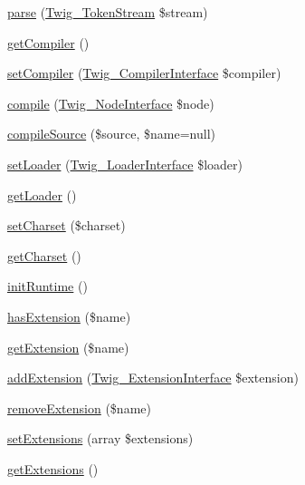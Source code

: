 \begin{DoxyCompactItemize}
\item 
\hyperlink{class_twig___environment_a1de4218ce9c025eaa18ce55616c98fe7}{parse} (\hyperlink{class_twig___token_stream}{Twig\+\_\+\+Token\+Stream} \$stream)
\item 
\hyperlink{class_twig___environment_ac37cd6bf8b37e0cde150727f16a535f8}{get\+Compiler} ()
\item 
\hyperlink{class_twig___environment_a1dcd474337e99babac147ee2384353de}{set\+Compiler} (\hyperlink{interface_twig___compiler_interface}{Twig\+\_\+\+Compiler\+Interface} \$compiler)
\item 
\hyperlink{class_twig___environment_a3f2ebfe4306bcd152c544085112319b5}{compile} (\hyperlink{interface_twig___node_interface}{Twig\+\_\+\+Node\+Interface} \$node)
\item 
\hyperlink{class_twig___environment_a71d4b339e442b2024b9849b9bc802b7a}{compile\+Source} (\$source, \$name=null)
\item 
\hyperlink{class_twig___environment_a7b2e6b9f72715d88eebb3ee0816057b4}{set\+Loader} (\hyperlink{interface_twig___loader_interface}{Twig\+\_\+\+Loader\+Interface} \$loader)
\item 
\hyperlink{class_twig___environment_a461527c1de39a5520c52951b8f03d99f}{get\+Loader} ()
\item 
\hyperlink{class_twig___environment_a81ee11b0f5fadecaece55170fea54b29}{set\+Charset} (\$charset)
\item 
\hyperlink{class_twig___environment_abca2d528da8311b6fcfe040768cbaa24}{get\+Charset} ()
\item 
\hyperlink{class_twig___environment_a0dac3aaa30b0ac1d920ebdfe22eaae7f}{init\+Runtime} ()
\item 
\hyperlink{class_twig___environment_a5ca11be64dd4ff9f21e31e3ebc2619b1}{has\+Extension} (\$name)
\item 
\hyperlink{class_twig___environment_af2f1572d80cede386cbf11bd7e213c31}{get\+Extension} (\$name)
\item 
\hyperlink{class_twig___environment_a370f3b63254ddd9a5c5b0a7d22013a95}{add\+Extension} (\hyperlink{interface_twig___extension_interface}{Twig\+\_\+\+Extension\+Interface} \$extension)
\item 
\hyperlink{class_twig___environment_a231cd85fca6feec29726a7b351baa112}{remove\+Extension} (\$name)
\item 
\hyperlink{class_twig___environment_ad226f4ce37612efcc6717bd592ca7b7d}{set\+Extensions} (array \$extensions)
\item 
\hyperlink{class_twig___environment_a0bf1cdb692f876fae6acd2bfbb548244}{get\+Extensions} ()

\end{DoxyCompactItemize}
